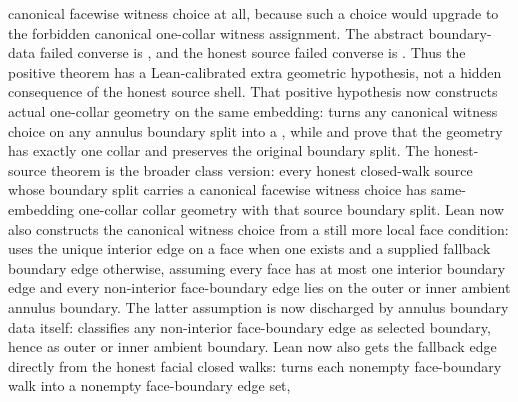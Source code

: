 \documentclass[11pt]{article}
\begin{document}
\begin{itemize}
canonical facewise witness choice at all, because such a choice would upgrade
to the forbidden canonical one-collar witness assignment.  The abstract
boundary-data failed converse is
,
and the honest source failed converse is
.
Thus the positive theorem
has a Lean-calibrated extra geometric hypothesis, not a hidden consequence of
the honest source shell.  That positive hypothesis now constructs actual
one-collar geometry on the same embedding:
turns any canonical witness choice on any annulus boundary split into a
, while
and
prove that the geometry has exactly one collar and preserves the original
boundary split.  The honest-source theorem
is the broader class version: every honest closed-walk source whose boundary
split carries a canonical facewise witness choice has same-embedding
one-collar collar geometry with that source boundary split.  Lean now also
constructs the canonical witness choice from a still more local face condition:
uses the unique interior edge on a face when one exists and a supplied fallback
boundary edge otherwise, assuming every face has at most one interior boundary
edge and every non-interior face-boundary edge lies on the outer or inner
ambient annulus boundary.  The latter assumption is now discharged by annulus
boundary data itself:
classifies any non-interior face-boundary edge as selected boundary, hence as
outer or inner ambient boundary.  Lean now also gets the fallback edge directly
from the honest facial closed walks:
turns each nonempty face-boundary walk into a nonempty face-boundary edge set,

\end{itemize}
\end{document}
